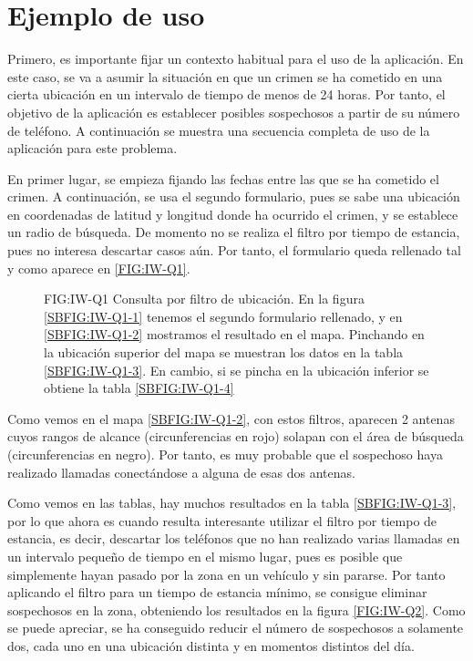   \section{Ejemplo de uso}
    Primero, es importante fijar un contexto habitual para el uso de la aplicación. En este caso, se va a asumir la situación en que un crimen se ha cometido en una cierta ubicación en un intervalo de tiempo de menos de 24 horas. Por tanto, el objetivo de la aplicación es establecer posibles sospechosos a partir de su número de teléfono.
    A continuación se muestra una secuencia completa de uso de la aplicación para este problema.
    
    En primer lugar, se empieza fijando las fechas entre las que se ha cometido el crimen. A continuación, se usa el segundo formulario, pues se sabe una ubicación en coordenadas de latitud y longitud donde ha ocurrido el crimen, y se establece un radio de búsqueda. De momento no se realiza el filtro por tiempo de estancia, pues no interesa descartar casos aún. Por tanto, el formulario queda rellenado tal y como aparece en \ref{FIG:IW-Q1}.
    
    \begin{figure}[Consulta por filtro de ubicación]{FIG:IW-Q1}
      {Consulta por filtro de ubicación. En la figura \ref{SBFIG:IW-Q1-1} tenemos el segundo formulario rellenado, y en \ref{SBFIG:IW-Q1-2} mostramos el resultado en el mapa. Pinchando en la ubicación superior del mapa se muestran los datos en la tabla \ref{SBFIG:IW-Q1-3}. En cambio, si se pincha en la ubicación inferior se obtiene la tabla \ref{SBFIG:IW-Q1-4}}
      \quad
      \quad
      \quad
    \end{figure}
  
    Como vemos en el mapa \ref{SBFIG:IW-Q1-2}, con estos filtros, aparecen 2 antenas cuyos rangos de alcance (circunferencias en rojo) solapan con el área de búsqueda (circunferencias en negro). Por tanto, es muy probable que el sospechoso haya realizado llamadas conectándose a alguna de esas dos antenas.
    
    Como vemos en las tablas, hay muchos resultados en la tabla \ref{SBFIG:IW-Q1-3}, por lo que ahora es cuando resulta interesante utilizar el filtro por tiempo de estancia, es decir, descartar los teléfonos que no han realizado varias llamadas en un intervalo pequeño de tiempo en el mismo lugar, pues es posible que simplemente hayan pasado por la zona en un vehículo y sin pararse. 
    Por tanto aplicando el filtro para un tiempo de estancia mínimo, se consigue eliminar sospechosos en la zona, obteniendo los resultados en la figura \ref{FIG:IW-Q2}. 
    Como se puede apreciar, se ha conseguido reducir el número de sospechosos a solamente dos, cada uno en una ubicación distinta y en momentos distintos del día.
    
